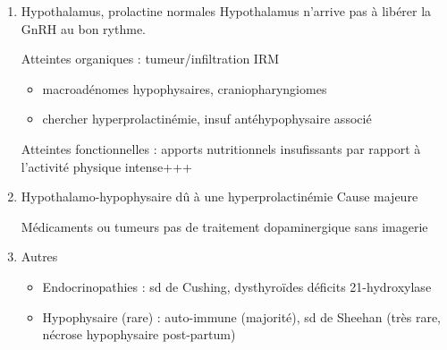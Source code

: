 \documentclass[11pt]{article}
\begin{document}
\begin{enumerate}
\item Hypothalamus, prolactine normales
\label{sec:org1ec2d69}
Hypothalamus n'arrive pas à libérer la GnRH au bon rythme. 

Atteintes organiques : tumeur/infiltration \thus IRM
\begin{itemize}
\item macroadénomes hypophysaires, craniopharyngiomes
\item chercher hyperprolactinémie, insuf antéhypophysaire associé
\end{itemize}

Atteintes fonctionnelles : apports nutritionnels insufissants par rapport à l'activité physique intense+++
\item Hypothalamo-hypophysaire dû à une hyperprolactinémie
\label{sec:orge7daa5b}
Cause majeure

Médicaments ou tumeurs \thus pas de traitement dopaminergique sans imagerie \danger
\item Autres
\label{sec:orgfb3a8d5}
\begin{itemize}
\item Endocrinopathies : sd de Cushing, dysthyroïdes déficits 21-hydroxylase
\item Hypophysaire (rare) : auto-immune (majorité), sd de Sheehan (très rare, nécrose hypophysaire post-partum)
\end{itemize}
\end{enumerate}
\end{document}
